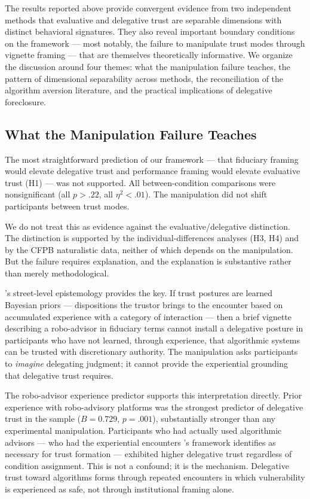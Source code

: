 The results reported above provide convergent evidence from two independent methods that evaluative and delegative trust are separable dimensions with distinct behavioral signatures. They also reveal important boundary conditions on the framework --- most notably, the failure to manipulate trust modes through vignette framing --- that are themselves theoretically informative. We organize the discussion around four themes: what the manipulation failure teaches, the pattern of dimensional separability across methods, the reconciliation of the algorithm aversion literature, and the practical implications of delegative foreclosure.

\subsection{What the Manipulation Failure Teaches}
\label{sec:disc_manipulation}

The most straightforward prediction of our framework --- that fiduciary framing would elevate delegative trust and performance framing would elevate evaluative trust (H1) --- was not supported. All between-condition comparisons were nonsignificant (all $p > .22$, all $\eta^2 < .01$). The manipulation did not shift participants between trust modes.

We do not treat this as evidence against the evaluative/delegative distinction. The distinction is supported by the individual-differences analyses (H3, H4) and by the CFPB naturalistic data, neither of which depends on the manipulation. But the failure requires explanation, and the explanation is substantive rather than merely methodological.

\citeauthor{hardin1993street}'s \citeyearpar{hardin1993street} street-level epistemology provides the key. If trust postures are learned Bayesian priors --- dispositions the trustor brings to the encounter based on accumulated experience with a category of interaction --- then a brief vignette describing a robo-advisor in fiduciary terms cannot install a delegative posture in participants who have not learned, through experience, that algorithmic systems can be trusted with discretionary authority. The manipulation asks participants to \emph{imagine} delegating judgment; it cannot provide the experiential grounding that delegative trust requires.

The robo-advisor experience predictor supports this interpretation directly. Prior experience with robo-advisory platforms was the strongest predictor of delegative trust in the sample ($B = 0.729$, $p = .001$), substantially stronger than any experimental manipulation. Participants who had actually used algorithmic advisors --- who had the experiential encounters \citeauthor{hardin1993street}'s framework identifies as necessary for trust formation --- exhibited higher delegative trust regardless of condition assignment. This is not a confound; it is the mechanism. Delegative trust toward algorithms forms through repeated encounters in which vulnerability is experienced as safe, not through institutional framing alone.


